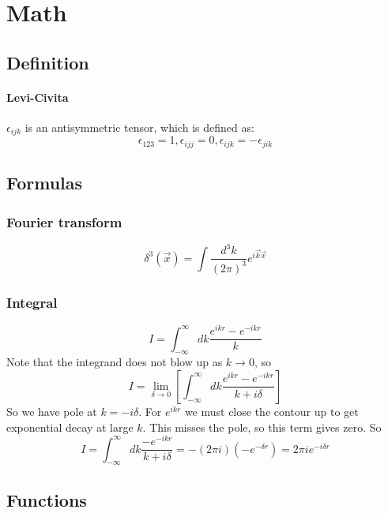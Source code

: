 \chapter{Math}

\section{Definition}
\subsubsection{Levi-Civita}
$\epsilon_{ijk}$ is an antisymmetric tensor, which is defined as: 
\[  \epsilon_{123} = 1, \epsilon_{ijj} = 0, \epsilon_{ijk} = -\epsilon_{jik} \]


\section{Formulas}

\subsection{Fourier transform}
\[
    \delta^3(\vec{x})=\int\frac{d^3k}{(2\pi)^3}e^{i\vec{k}\vec{x}}
    \]

\subsection{Integral}
\[
    I=\int_{-\infty}^{\infty}dk\frac{e^{ikr}-e^{-ikr}}{k}
    \]
Note that the integrand does not blow up as $k \rightarrow 0$, so
\[
    I=\displaystyle\lim_{\delta\rightarrow{0}}\left[\int_{-\infty}^{\infty}dk\frac{e^{ikr}-e^{-ikr}}{k+i\delta}\right]
    \]
So we have pole at $k = -i\delta$. For $e^{ikr}$ we must close the contour
up to get exponential decay at large $\mathit{k}$. This misses the pole, so
this term gives zero. So
\[
    I=\int_{-\infty}^{\infty}dk\frac{-e^{-ikr}}{k+i\delta}=-(2\pi{i})(-e^{-\delta{r}})=2\pi{i}e^{-i\delta{r}}
    \]

\section{Functions}

